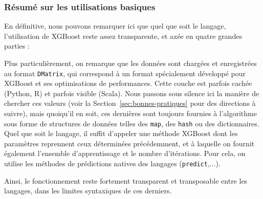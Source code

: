 \subsubsection{Résumé sur les utilisations basiques}
En définitive, nous pouvons remarquer ici que quel que soit le langage, l'utilisation de XGBoost reste assez transparente, et axée en quatre grandes parties :\begin{itemize}
	Plus particulièrement, on remarque que les données sont chargées et enregistrées au format \og\texttt{DMatrix}\fg, qui correspond à un format spécialement développé pour XGBoost et ses optimisations de performances. Cette couche est parfois cachée (Python, R) et parfois visible (Scala).
	Nous passons sous silence ici la manière de chercher ces valeurs (voir la Section~\ref{sec:bonnes-pratiques} pour des directions à suivre), mais quoiqu'il en soit, ces dernières sont toujours fournies à l'algorithme sous forme de structures de données telles des \texttt{map}, des \texttt{hash} ou des dictionnaires.
	Quel que soit le langage, il suffit d'appeler une méthode XGBoost dont les paramètres reprennent ceux déterminées précédemment, et à laquelle on fournit également l'ensemble d'apprentissage et le nombre d'itérations.
	Pour cela, on utilise les méthodes de prédictions natives des langages (\texttt{predict},...).
\end{itemize}
Ainsi, le fonctionnement reste fortement transparent et transposable entre les langages, dans les limites syntaxiques de ces derniers.
